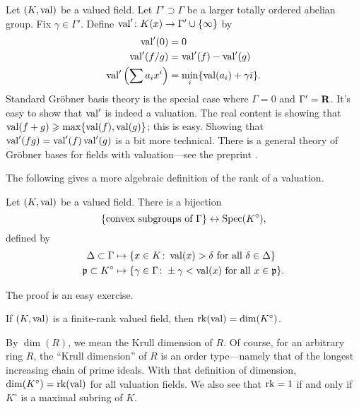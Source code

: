 Let $(K,\operatorname{val})$ be a valued field. Let $\Gamma'\supset\Gamma$ be a 
larger totally ordered abelian group. Fix $\gamma\in \Gamma'$. Define 
$\operatorname{val}'\colon K(x)\to \Gamma'\cup\{\infty\}$ by 
\begin{align*}
	\operatorname{val}'(0) &= 0 \\
	\operatorname{val}'(f/g) &= \operatorname{val}'(f)-\operatorname{val}'(g) \\
	\operatorname{val}'\left(\sum a_i x^i\right) &= \min_i \{\operatorname{val}(a_i)+\gamma i\} .
\end{align*}
Standard Gr\"obner basis theory is the special case where $\Gamma=0$ and 
$\Gamma'=\mathbf{R}$. It's easy to show that $\operatorname{val}'$ is indeed a valuation. 
The real content is showing that 
$\operatorname{val}(f+g)\geqslant \max\{\operatorname{val}(f),\operatorname{val}(g)\}$; this is easy. 
Showing that $\operatorname{val}'(fg)=\operatorname{val}'(f)\operatorname{val}'(g)$ is a bit more 
technical. There is a general theory of Gr\"obner bases for fields with 
valuation---see the preprint \cite{chan-maclagan}.

The following gives a more algebraic definition of the rank of a valuation. 

\begin{theorem}
Let $(K,\operatorname{val})$ be a valued field. There is a bijection 
\[
  \{\text{convex subgroups of $\Gamma$}\} \leftrightarrow \operatorname{Spec}(K^\circ) ,
\]
defined by 
\begin{align*}
  \Delta\subset\Gamma &\mapsto \{x\in K\colon \operatorname{val}(x)>\delta\text{ for all }\delta\in \Delta\} \\
  \mathfrak{p}\subset K^\circ &\mapsto \{\gamma\in\Gamma\colon \pm\gamma<\operatorname{val}(x)\text{ for all }x\in \mathfrak{p}\} .
\end{align*}
\end{theorem}

The proof is an easy exercise. 

\begin{corollary}
If $(K,\operatorname{val})$ is a finite-rank valued field, then 
$\operatorname{rk}(\operatorname{val})=\dim(K^\circ)$. 
\end{corollary}

By $\dim(R)$, we mean the Krull dimension of $R$. Of course, for an arbitrary 
ring $R$, the ``Krull dimension'' of $R$ is an order type---namely that of the 
longest increasing chain of prime ideals. With that definition of dimension, 
$\dim(K^\circ)=\operatorname{rk}(\operatorname{val})$ for all valuation fields. We also see that 
$\operatorname{rk}=1$ if and only if $K^\circ$ is a maximal subring of $K$. 





